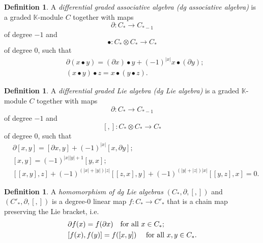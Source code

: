 \documentclass[10pt]{amsart}
\numberwithin{equation}{section}
\theoremstyle{plain}
\theoremstyle{definition}
\newtheorem{definition}[theorem]{Definition}
\theoremstyle{remark}
\numberwithin{equation}{section}
\newcommand{\K}{\mathbb{K}}
\begin{document}
{\begin{definition}\label{Defn: dgAa}
	A \emph{differential graded associative algebra (dg associative algebra)} is a graded $\K$-module $C$ together with maps 
	\[
		\partial \colon C_*\to C_{*-1}
	\]
	of degree $-1$ and 
	\[
		\bullet\colon C_*\otimes C_*\to C_*
	\]
	of degree $0$, such that 
	\begin{align}
		& \partial(x\bullet y) = (\partial x) \bullet y + (-1)^{|x|} x \bullet (\partial y); \label{Eq: dgaLeibniz}\\
		& (x\bullet y)\bullet z = x\bullet (y\bullet z).\label{Eq: dgaAssoc}
	\end{align}
\end{definition}

\begin{definition}\label{Defn: dgLa}
	A \emph{differential graded Lie algebra (dg Lie algebra)} is a graded $\K$-module $C$ together with maps \[\partial\colon C_*\to C_{*-1}\] of degree $-1$ and \[[,]\colon C_*\otimes C_*\to C_*\]of degree $0$, such that 
	\begin{align}
		& \partial [x,y]= [\partial x, y]+(-1)^{|x|}[x,\partial y]; \label{Eq: dgLa Leib}\\
		& [x,y] = (-1)^{|x||y|+1}[y,x];\label{Eq: dgLa antisym} \\
		& [[x,y],z] + (-1)^{(|x|+|y|)|z|}[[z,x],y]+ (-1)^{(|y|+|z|)|x|}[[y,z],x]=0. \label{Eq: dgLa Jacobi}
	\end{align}
\end{definition}



\begin{definition}
	A \emph{homomorphism of dg Lie algebras} $(C_*,\partial,[,])$ and $(C'_*,\partial,[,])$  is a degree-0 linear map $f\colon C_*\to C'_*$ that is a chain map preserving the Lie bracket, i.e.\begin{align*}
		 & \partial f(x) = f(\partial x) \quad \textup{for all }x\in C_*; 	\\&[f(x),f(y)] = f([x,y])\quad \textup{ for all }x,y\in C_*. 
	\end{align*} 
\end{definition}

}
\end{document}
